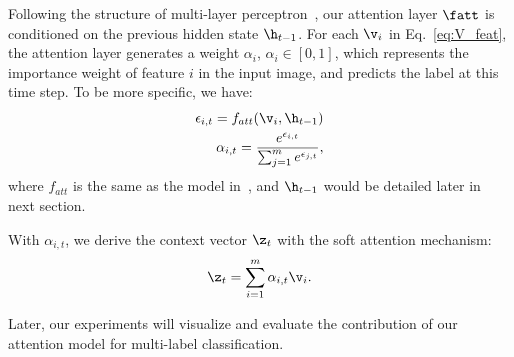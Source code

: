 \documentclass[letterpaper]{article} %
\begin{document}
Following the structure of multi-layer perceptron~\cite{xu2015show}, our attention layer $\fatt$ is conditioned on the previous hidden state $\h_{t-1}$. For each $\v_i$ in Eq.~\ref{eq:V_feat}, the attention layer generates a weight $\alpha_i$, $\alpha_i \in [0, 1]$, which represents the importance weight of feature $i$ in the input image, and predicts the label at this time step. To be more specific, we have:
\begin{equation}
\label{eq:atten_weight}
\begin{aligned}
\epsilon_{i,t} = f_{att}(\v_i, \h_{t-1}) \\
\alpha_{i,t} = \frac{e^{\epsilon_{i,t}} }{ \sum_{j=1}^m e^{\epsilon_{j,t}}},
\end{aligned}
\end{equation}
where $f_{att}$ is the same as the model in~\cite{xu2015show}, and $\h_{t-1}$ would be detailed later in next section.

With $\alpha_{i,t}$, we derive the context vector $\z_t$ with the soft attention mechanism:
\begin{equation}
\label{eq:context}
\begin{aligned}
\z_t = \sum_{i=1}^m \alpha_{i,t}\v_i.
\end{aligned}
\end{equation}

Later, our experiments will visualize and evaluate the contribution of our attention model for multi-label classification.\\
\end{document}
